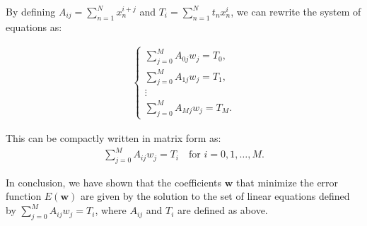 \documentclass{article}
\begin{document}
\begin{tcolorbox}[breakable,colback=gray!5,colframe=gray!60,title=Solution]
By defining $A_{ij} = \sum_{n=1}^N x_n^{i+j}$ and $T_i = \sum_{n=1}^N t_n x_n^i$, we can rewrite the system of equations as:

\begin{align*}
\begin{cases}
\sum_{j=0}^M A_{0j} w_j = T_0, \\
\sum_{j=0}^M A_{1j} w_j = T_1, \\
\vdots \\
\sum_{j=0}^M A_{Mj} w_j = T_M.
\end{cases}
\end{align*}

This can be compactly written in matrix form as:
\begin{align*}
\sum_{j=0}^M A_{ij} w_j = T_i \quad \text{for } i = 0, 1, \ldots, M.
\end{align*}


In conclusion, we have shown that the coefficients $\textbf{w}$ that minimize the error function $E(\textbf{w})$ are given by the solution to the set of linear equations defined by $\sum_{j=0}^M A_{ij} w_j = T_i$, where $A_{ij}$ and $T_i$ are defined as above.

\end{tcolorbox}
\end{document}
